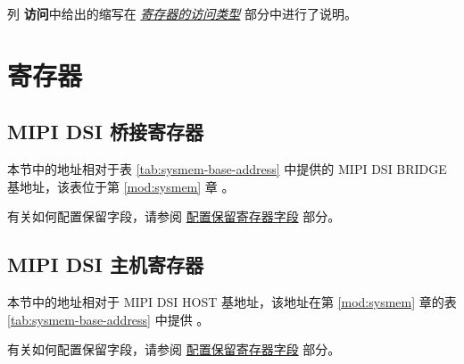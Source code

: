 \documentclass[main\_\_CN.tex]{subfiles}
\begin{document}
列 \textbf{访问}中给出的缩写在 \hyperref[glossary-access-types]{\textit{寄存器的访问类型}} 部分中进行了说明。







\newpage

\section{寄存器}



\subsection{MIPI DSI 桥接寄存器}
本节中的地址相对于表 \ref{tab:sysmem-base-address} 中提供的 MIPI DSI BRIDGE 基地址，该表位于第 \ref{mod:sysmem} 章 \textit{}。

有关如何配置保留字段，请参阅 \hyperref[programming-reserved-field]{配置保留寄存器字段} 部分。



\subsection{MIPI DSI 主机寄存器}
本节中的地址相对于 MIPI DSI HOST 基地址，该地址在第 \ref{mod:sysmem} 章的表 \ref{tab:sysmem-base-address} 中提供 \textit{}。

有关如何配置保留字段，请参阅 \hyperref[programming-reserved-field]{配置保留寄存器字段} 部分。


\end{document}
